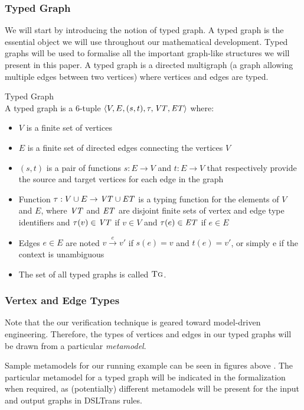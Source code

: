 \subsubsection*{Typed Graph}
We will start by introducing the notion of typed graph. A typed graph is the essential object we will use throughout our mathematical development. Typed graphs will be used to formalise all the important graph-like structures we will present in this paper. A typed graph is a directed multigraph (a graph allowing multiple edges between two vertices) where vertices and edges are typed.


\begin{definition}{Typed Graph\\}
\label{def:typed_graph}
A typed graph is a 6-tuple $\langle V,E,(s,t),\tau, \mathit{VT}, \mathit{ET}\rangle$ where:
\begin{itemize}
\item $V$ is a finite set of vertices
\item $E$ is a finite set of directed edges connecting the vertices $V$
\item $(s,t)$ is a pair of functions $s: E\rightarrow V$ and $t: E\rightarrow V$ that respectively provide the source and target vertices for each edge in the graph
\item Function $\tau:V\cup E\rightarrow \mathit{VT} \cup \mathit{ET}$ is a typing function for the elements of $V$ and $E$, where $\mathit{VT}$ and $\mathit{ET}$ are disjoint finite sets of vertex and edge type identifiers and $\tau(v)\in \mathit{VT}$ if $v\in V$ and $\tau(e)\in \mathit{ET}$ if $e\in E$
\item Edges $e\in E$ are noted $v\xrightarrow{e} v'$ if $s(e)=v$ and $t(e)=v'$, or simply e if the context is unambiguous
\item The set of all typed graphs is called $\textsc{Tg}$. 
\end{itemize}
\end{definition}


\subsubsection{Vertex and Edge Types}

Note that the our verification technique is geared toward model-driven engineering. Therefore, the types of vertices and edges in our typed graphs will be drawn from a particular \textit{metamodel}.

Sample metamodels for our running example can be seen in figures above . The particular metamodel for a typed graph will be indicated in the formalization when required, as (potentially) different metamodels will be present for the input and output graphs in DSLTrans rules.

